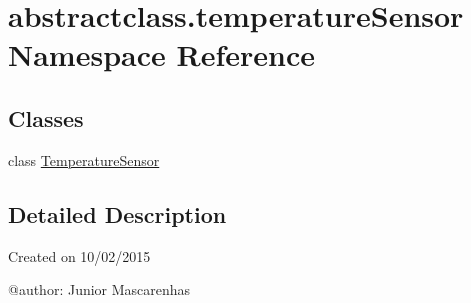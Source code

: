 \hypertarget{namespaceabstractclass_1_1temperatureSensor}{}\section{abstractclass.\+temperature\+Sensor Namespace Reference}
\label{namespaceabstractclass_1_1temperatureSensor}
\subsection*{Classes}
\begin{DoxyCompactItemize}
\item 
class \hyperlink{classabstractclass_1_1temperatureSensor_1_1TemperatureSensor}{Temperature\+Sensor}
\end{DoxyCompactItemize}


\subsection{Detailed Description}
\begin{DoxyVerb}Created on 10/02/2015

@author: Junior Mascarenhas
\end{DoxyVerb}
 